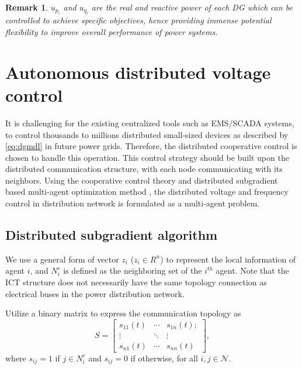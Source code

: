 \documentclass{article}
\newtheorem{remark}{Remark}[section]
\begin{document}
\begin{remark}
$u_{p_i}$ and $u_{q_i}$ are the real and reactive power of each DG which can be controlled to achieve specific objectives, hence providing immense potential flexibility to improve overall performance of power systems.
\end{remark}


\section{Autonomous distributed voltage control}
It is challenging for the existing centralized tools such as EMS/SCADA systems, to control thousands to millions distributed small-sized devices as described by \eqref{eq:dgmdl} in future power grids. Therefore, the distributed cooperative  control is chosen to handle this operation.
This control strategy should be built upon the distributed communication structure, with each node communicating with its neighbors. Using the cooperative control theory \cite{qu2009cooperative} and distributed subgradient based multi-agent optimization method \cite{nedic2009distributed}, the distributed voltage and frequency control in distribution network is formulated as a multi-agent problem. 

\subsection{Distributed subgradient algorithm}
We use a general form of vector $ z_i$ ($z_i \in R^n$) to represent the local information of agent $i$, and $N_i^c$ is defined as the neighboring set of the $i^{th}$ agent. Note that the ICT structure does not necessarily have the same topology connection as electrical buses in the power distribution network.\par
Utilize a binary matrix to express the communication topology as
\begin{equation}
S = \left[
\begin{array}{ccc}
s_{11}(t)&\cdots & s_{1n}(t);\\
 \vdots&  \ddots &\vdots \\
s_{n1}(t)&\cdots &s_{nn}(t)
\end{array}
\right],\label{eq:comms}
\end{equation}
where $s_{ij} = 1$ if $j \in N_i^c$ and $s_{ij} = 0$ if otherwise, for all $i,j \in \mathcal{N}$.
\end{document}
